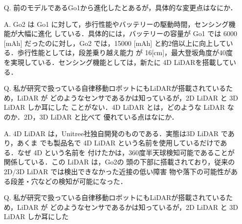 \documentclass{jsarticle}
\begin{document}
\begin{itemize}
  \addtolength{\itemindent}{5.4zw}
  \item [Q.]前のモデルであるGo1から進化したとあるが，具体的な変更点はなにか．
  \vspace*{1zh}

  \item [A.]Go2 は Go1 に対して，歩行性能やバッテリーの駆動時間，センシング機能が大幅に進化
  \hspace*{5.5zw}している．具体的には，バッテリーの容量が Go1 では 6000 [mAh] だったのに対し，Go2
  \hspace*{5.5zw}では，15000 [mAh] と約2倍以上に向上している．歩行性能としては，段差乗り越え能力
  \hspace*{5.5zw}が 16[cm]，最大登坂角度が40度を実現している．センシング機能としては，新たに 4D 
  \hspace*{5.5zw}LiDARを搭載している．\\
  \vspace*{1zh}

  \item [Q.]私が研究で扱っている自律移動ロボットにもLiDARが搭載されているため，LiDAR が 
  \hspace*{5.5zw}どのようなセンサであるかは知っているが，2D LiDAR と 3D LiDAR しか耳にした
  \hspace*{5.5zw}ことがない．4D LiDAR とは，どのような LiDAR なのか．2D，3D LiDAR と比べて
  \hspace*{5.5zw}優れている点はなにか．
  \vspace*{1zh}

  \item [A.]4D LiDAR は，Unitree社独自開発のものである．実態は3D LiDAR であり，あくま
  \hspace*{5.5zw}でも製品名で 4D LiDAR という名前を使用しているだけである．なぜ 4D という名前を
  \hspace*{5.5zw}付けたかは，360度半天球検知可能であることが関係している．この LiDAR は，Go2の
  \hspace*{5.5zw}頭の下部に搭載されており，従来の2D/3D LiDAR では検出できなかった近接の低い障害
  \hspace*{5.5zw}物や落下の可能性がある段差・穴などの検知が可能になった．\\
  \vspace*{1zh}

  \item [Q.]私が研究で扱っている自律移動ロボットにもLiDARが搭載されているため，LiDAR が 
  \hspace*{5.5zw}どのようなセンサであるかは知っているが，2D LiDAR と 3D LiDAR しか耳にした
  \vspace*{1zh}


\end{itemize}
\end{document}
